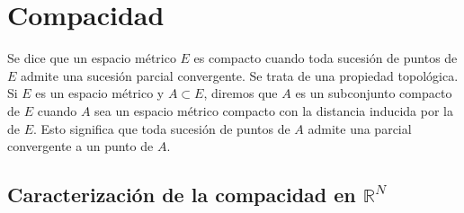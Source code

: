 \documentclass[11pt,titlepage,a4paper]{article}
\theoremstyle{definition}
\begin{document}
\section{Compacidad}

Se dice que un espacio métrico $E$ es compacto cuando toda sucesión de puntos de 
$E$ admite una sucesión parcial convergente. Se trata de una propiedad topológica.
\\

Si $E$ es un espacio métrico y $A\subset E$, diremos que $A$ es un subconjunto
compacto de $E$ cuando $A$ sea un espacio métrico compacto con la distancia inducida
por la de $E$. Esto significa que toda sucesión de puntos de $A$ admite una parcial
convergente a un punto de $A$.

\subsection{Caracterización de la compacidad en \textbf{$\mathbb{R}^N$}}
\end{document}
